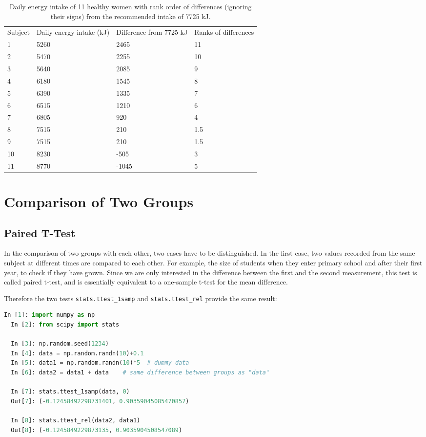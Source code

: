 \begin{table}
  \centering
  \begin{tabular}{l p{2.5cm} p{2.5cm} p{2.5cm}}
     \hline
     Subject & Daily energy intake (kJ) & Difference from 7725 kJ & Ranks of differences \\
     1 & 5260 & 2465 & 11 \\
     2 & 5470 & 2255 & 10 \\
     3 & 5640 & 2085 & 9 \\
     4 & 6180 & 1545 & 8 \\
     5 & 6390 & 1335 & 7 \\
     6 & 6515 & 1210 & 6 \\
     7 & 6805 & 920 & 4 \\
     8 & 7515 & 210 & 1.5 \\
     9 & 7515 & 210 & 1.5 \\
     10 & 8230 & -505 & 3 \\
     11 & 8770 & -1045 & 5 \\
     \hline
   \end{tabular}
  \caption{Daily energy intake of 11 healthy women with rank order of differences (ignoring their signs) from the recommended intake of 7725 kJ.}\label{tab:wilcoxon}
\end{table}


\section{Comparison of Two Groups} 

\subsection{Paired T-Test}
In the comparison of two groups with each other, two cases have to be distinguished. In the first case, two values recorded from the same subject at different times are compared to each other. For example, the size of students when they enter primary school and after their first year, to check if they have grown. Since we are only interested in the difference between the first and the second measurement, this test is called \gls{paired} t-test, and is essentially equivalent to a one-sample t-test for the mean difference.

Therefore the two tests \lstinline{stats.ttest_1samp} and \lstinline{stats.ttest_rel} provide the same result:

\begin{lstlisting}[language=Python]
  In [1]: import numpy as np
  In [2]: from scipy import stats

  In [3]: np.random.seed(1234)
  In [4]: data = np.random.randn(10)+0.1
  In [5]: data1 = np.random.randn(10)*5  # dummy data
  In [6]: data2 = data1 + data    # same difference between groups as "data"

  In [7]: stats.ttest_1samp(data, 0)
  Out[7]: (-0.12458492298731401, 0.90359045085470857)

  In [8]: stats.ttest_rel(data2, data1)
  Out[8]: (-0.1245849229873135, 0.9035904508547089)
\end{lstlisting}

